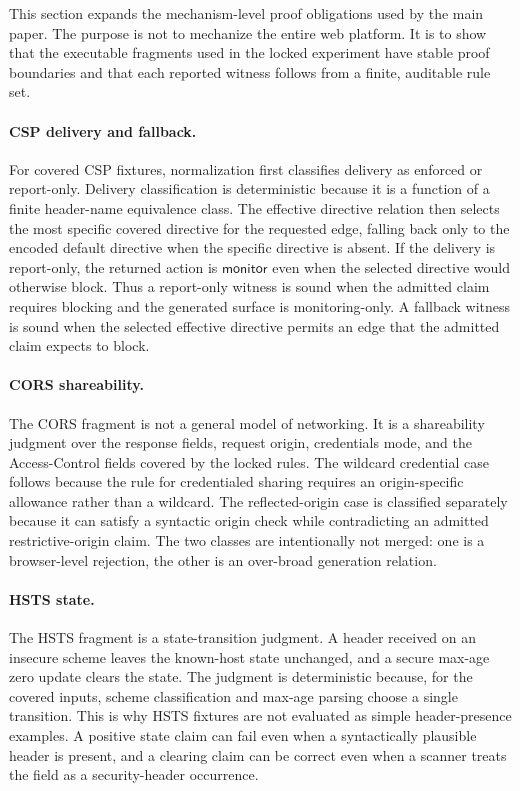 \documentclass[10pt,conference]{IEEEtran}
\newcommand{\monitor}{\ensuremath{\mathsf{monitor}}}
\begin{document}
This section expands the mechanism-level proof obligations used by the main paper. The purpose is not to mechanize the entire web platform. It is to show that the executable fragments used in the locked experiment have stable proof boundaries and that each reported witness follows from a finite, auditable rule set.

\paragraph{CSP delivery and fallback.}
For covered CSP fixtures, normalization first classifies delivery as enforced or report-only. Delivery classification is deterministic because it is a function of a finite header-name equivalence class. The effective directive relation then selects the most specific covered directive for the requested edge, falling back only to the encoded default directive when the specific directive is absent. If the delivery is report-only, the returned action is \monitor{} even when the selected directive would otherwise block. Thus a report-only witness is sound when the admitted claim requires blocking and the generated surface is monitoring-only. A fallback witness is sound when the selected effective directive permits an edge that the admitted claim expects to block.

\paragraph{CORS shareability.}
The CORS fragment is not a general model of networking. It is a shareability judgment over the response fields, request origin, credentials mode, and the Access-Control fields covered by the locked rules. The wildcard credential case follows because the rule for credentialed sharing requires an origin-specific allowance rather than a wildcard. The reflected-origin case is classified separately because it can satisfy a syntactic origin check while contradicting an admitted restrictive-origin claim. The two classes are intentionally not merged: one is a browser-level rejection, the other is an over-broad generation relation.

\paragraph{HSTS state.}
The HSTS fragment is a state-transition judgment. A header received on an insecure scheme leaves the known-host state unchanged, and a secure max-age zero update clears the state. The judgment is deterministic because, for the covered inputs, scheme classification and max-age parsing choose a single transition. This is why HSTS fixtures are not evaluated as simple header-presence examples. A positive state claim can fail even when a syntactically plausible header is present, and a clearing claim can be correct even when a scanner treats the field as a security-header occurrence.
\end{document}
